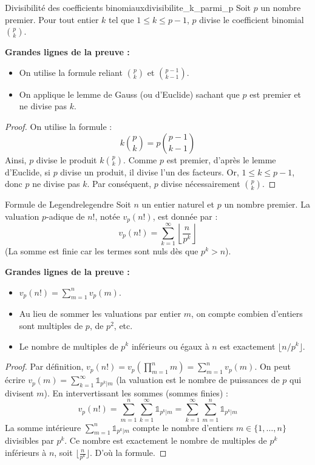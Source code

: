 \documentclass{prepacours}
\begin{document}
\begin{proposition}{Divisibilité des coefficients binomiaux}{divisibilite_k_parmi_p}
    Soit $p$ un nombre premier.
    Pour tout entier $k$ tel que $1 \le k \le p-1$, $p$ divise le coefficient binomial $\binom{p}{k}$.
\end{proposition}

\noindent \textbf{Grandes lignes de la preuve :}
\begin{itemize}
    \item On utilise la formule reliant $\binom{p}{k}$ et $\binom{p-1}{k-1}$.
    \item On applique le lemme de Gauss (ou d'Euclide) sachant que $p$ est premier et ne divise pas $k$.
\end{itemize}

\begin{proof}
    On utilise la formule :
    \[ k \binom{p}{k} = p \binom{p-1}{k-1} \]
    Ainsi, $p$ divise le produit $k \binom{p}{k}$.
    Comme $p$ est premier, d'après le lemme d'Euclide, si $p$ divise un produit, il divise l'un des facteurs.
    Or, $1 \le k \le p-1$, donc $p$ ne divise pas $k$.
    Par conséquent, $p$ divise nécessairement $\binom{p}{k}$.
\end{proof}

\begin{proposition}{Formule de Legendre}{legendre}
    Soit $n$ un entier naturel et $p$ un nombre premier. La valuation $p$-adique de $n!$, notée $v_p(n!)$, est donnée par :
    \[ v_p(n!) = \sum_{k=1}^{\infty} \left\lfloor \frac{n}{p^k} \right\rfloor \]
    (La somme est finie car les termes sont nuls dès que $p^k > n$).
\end{proposition}

\noindent \textbf{Grandes lignes de la preuve :}
\begin{itemize}
    \item $v_p(n!) = \sum_{m=1}^n v_p(m)$.
    \item Au lieu de sommer les valuations par entier $m$, on compte combien d'entiers sont multiples de $p$, de $p^2$, etc.
    \item Le nombre de multiples de $p^k$ inférieurs ou égaux à $n$ est exactement $\lfloor n/p^k \rfloor$.
\end{itemize}

\begin{proof}
    Par définition, $v_p(n!) = v_p\left(\prod_{m=1}^n m\right) = \sum_{m=1}^n v_p(m)$.
    On peut écrire $v_p(m) = \sum_{k=1}^{\infty} \mathbb{1}_{p^k | m}$ (la valuation est le nombre de puissances de $p$ qui divisent $m$).
    En intervertissant les sommes (sommes finies) :
    \[ v_p(n!) = \sum_{m=1}^n \sum_{k=1}^{\infty} \mathbb{1}_{p^k | m} = \sum_{k=1}^{\infty} \sum_{m=1}^n \mathbb{1}_{p^k | m} \]
    La somme intérieure $\sum_{m=1}^n \mathbb{1}_{p^k | m}$ compte le nombre d'entiers $m \in \{1, \dots, n\}$ divisibles par $p^k$.
    Ce nombre est exactement le nombre de multiples de $p^k$ inférieurs à $n$, soit $\lfloor \frac{n}{p^k} \rfloor$.
    D'où la formule.
\end{proof}
\end{document}
